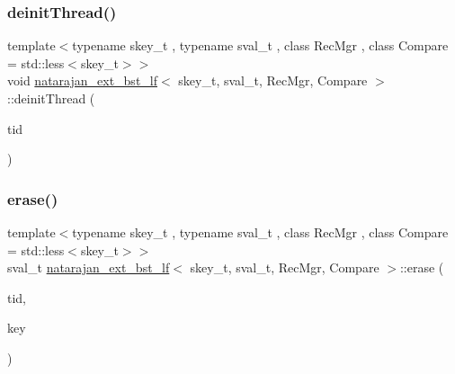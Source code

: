 \mbox{\label{classnatarajan__ext__bst__lf_a51fbc22d01b758dad5a4a64d1d7e62bc}} 
\subsubsection{\texorpdfstring{deinit\+Thread()}{deinitThread()}\hspace{0.1cm}{\footnotesize\ttfamily [2/2]}}
{\footnotesize\ttfamily template$<$typename skey\+\_\+t , typename sval\+\_\+t , class Rec\+Mgr , class Compare  = std\+::less$<$skey\+\_\+t$>$$>$ \\
void \hyperlink{classnatarajan__ext__bst__lf}{natarajan\+\_\+ext\+\_\+bst\+\_\+lf}$<$ skey\+\_\+t, sval\+\_\+t, Rec\+Mgr, Compare $>$\+::deinit\+Thread (\begin{DoxyParamCaption}\item[{const int}]{tid }\end{DoxyParamCaption})\hspace{0.3cm}{\ttfamily [inline]}}

\mbox{\label{classnatarajan__ext__bst__lf_a4e26b944d7a22b38c367a5a9272a65df}} 
\subsubsection{\texorpdfstring{erase()}{erase()}\hspace{0.1cm}{\footnotesize\ttfamily [1/2]}}
{\footnotesize\ttfamily template$<$typename skey\+\_\+t , typename sval\+\_\+t , class Rec\+Mgr , class Compare  = std\+::less$<$skey\+\_\+t$>$$>$ \\
sval\+\_\+t \hyperlink{classnatarajan__ext__bst__lf}{natarajan\+\_\+ext\+\_\+bst\+\_\+lf}$<$ skey\+\_\+t, sval\+\_\+t, Rec\+Mgr, Compare $>$\+::erase (\begin{DoxyParamCaption}\item[{const int}]{tid,  }\item[{skey\+\_\+t}]{key }\end{DoxyParamCaption})\hspace{0.3cm}{\ttfamily [inline]}}

